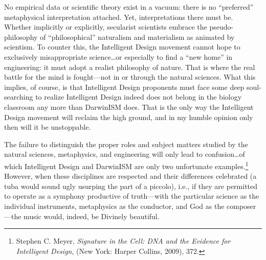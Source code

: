 No empirical data or scientific theory exist in a vacuum: there is no ``preferred'' metaphysical interpretation attached. Yet, interpretations there must be. Whether implicitly or explicitly, secularist scientists embrace the pseudo-philosophy of ``philosophical'' naturalism and materialism as animated by scientism. To counter this, the Intelligent Design movement cannot hope to exclusively misappropriate science\ldots or especially to find a ``new home'' in engineering: it must adopt a realist philosophy of nature. That is where the real battle for the mind is fought---not in or through the natural sciences. What this implies, of course, is that Intelligent Design proponents must face some deep soul-searching to realize Intelligent Design indeed does not belong in the biology classroom any more than DarwinISM does. That is the only way the Intelligent Design movement will reclaim the high ground, and in my humble opinion only then will it be unstoppable.

The failure to distinguish the proper roles and subject matters studied by the natural sciences, metaphysics, and engineering will only lead to confusion\ldots of which Intelligent Design and DarwinISM are only two unfortunate examples.\footnote{Stephen C. Meyer, \textit{Signature in the Cell: DNA and the Evidence for Intelligent Design}, (New York: Harper Collins, 2009), 372.} However, when these disciplines are respected and their differences celebrated (a tuba would sound ugly usurping the part of a piccolo), i.e., if they are permitted to operate as a symphony productive of truth---with the particular science as the individual instruments, metaphysics as the conductor, and God as the composer---the music would, indeed, be Divinely beautiful.



